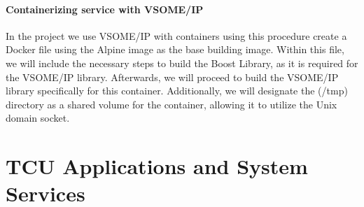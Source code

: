 \documentclass[
12pt,
oneside, 
onehalfspacing, 
nolistspacing, 
parskip, 
chapterinoneline, 
]{AASTCOMPUTER}
\begin{document}
\subsubsection{Containerizing service with VSOME/IP}

In the project we use VSOME/IP with containers using this procedure create a Docker file using the Alpine image as the base building image. Within this file, we will include the necessary steps to build the Boost Library, as it is required for the VSOME/IP library. Afterwards, we will proceed to build the VSOME/IP library specifically for this container. Additionally, we will designate the (/tmp) directory as a shared volume for the container, allowing it to utilize the Unix domain socket.

\chapter{TCU Applications and System Services}
\end{document}
